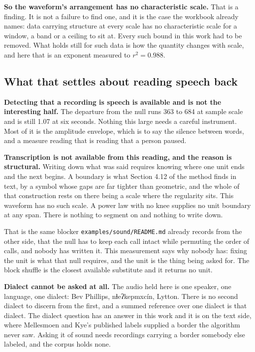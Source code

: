 \textbf{So the waveform's arrangement has no characteristic scale.} That is a finding. It is not a
failure to find one, and it is the case the workbook already names: data carrying structure at every
scale has no characteristic scale for a window, a band or a ceiling to sit at. Every
such bound in this work had to be removed. What holds still for such data is how the quantity changes
with scale, and here that is an exponent measured to \(r^2 = 0.988\).

\subsection{What that settles about reading speech back}

\textbf{Detecting that a recording is speech is available and is not the interesting half.} The
departure from the null runs 363 to 684 at sample scale and is still 1.07 at six seconds. Nothing
this large needs a careful instrument. Most of it is the amplitude envelope, which is to say the
silence between words, and a measure reading that is reading that a person paused.

\textbf{Transcription is not available from this reading, and the reason is structural.} Writing down
what was said requires knowing where one unit ends and the next begins. A boundary is what
Section 4.12 of the method finds in text, by a symbol whose gaps are far tighter than geometric, and
the whole of that construction rests on there being a scale where the regularity sits. This waveform
has no such scale. A power law with no knee supplies no unit boundary at any span. There is
nothing to segment on and nothing to write down.

That is the same blocker \texttt{examples/\allowbreak{}sound/\allowbreak{}README.\allowbreak{}md}
already records from the other side, that the null has to keep each call intact while
permuting the order of calls, and nobody has written it. This measurement says why nobody has: fixing
the unit is what that null requires, and the unit is the thing being asked for. The block shuffle is
the closest available substitute and it returns no unit.

\textbf{Dialect cannot be asked at all.} The audio held here is one speaker, one language, one
dialect: Bev Phillips, nɬeʔkepmxcín, Lytton. There is no second dialect to discern from the first, and
a summed reference over one dialect is that dialect. The dialect question has an answer in this work
and it is on the text side, where Mellesmoen and Kye's published labels supplied a border the
algorithm never saw. Asking it of sound needs recordings carrying a border somebody else labeled, and
the corpus holds none.

